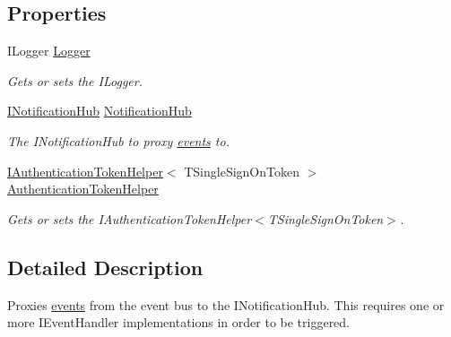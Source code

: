 \subsection*{Properties}
\begin{DoxyCompactItemize}
\item 
I\+Logger \hyperlink{classCqrs_1_1WebApi_1_1Events_1_1Handlers_1_1SingleSignOnTokenEventToHubProxy_a64eb9e620b1d0474ed7f0f2a4fad9ac1_a64eb9e620b1d0474ed7f0f2a4fad9ac1}{Logger}
\begin{DoxyCompactList}\small\item\em Gets or sets the I\+Logger. \end{DoxyCompactList}\item 
\hyperlink{interfaceCqrs_1_1WebApi_1_1SignalR_1_1Hubs_1_1INotificationHub}{I\+Notification\+Hub} \hyperlink{classCqrs_1_1WebApi_1_1Events_1_1Handlers_1_1SingleSignOnTokenEventToHubProxy_a9621749560e567a6252f3d7e2328174d_a9621749560e567a6252f3d7e2328174d}{Notification\+Hub}
\begin{DoxyCompactList}\small\item\em The I\+Notification\+Hub to proxy \hyperlink{}{events} to. \end{DoxyCompactList}\item 
\hyperlink{interfaceCqrs_1_1Authentication_1_1IAuthenticationTokenHelper}{I\+Authentication\+Token\+Helper}$<$ T\+Single\+Sign\+On\+Token $>$ \hyperlink{classCqrs_1_1WebApi_1_1Events_1_1Handlers_1_1SingleSignOnTokenEventToHubProxy_af317368318ce327bf520255c420e0b18_af317368318ce327bf520255c420e0b18}{Authentication\+Token\+Helper}
\begin{DoxyCompactList}\small\item\em Gets or sets the I\+Authentication\+Token\+Helper$<$\+T\+Single\+Sign\+On\+Token$>$. \end{DoxyCompactList}\end{DoxyCompactItemize}


\subsection{Detailed Description}
Proxies \hyperlink{}{events} from the event bus to the I\+Notification\+Hub. This requires one or more I\+Event\+Handler implementations in order to be triggered. 


